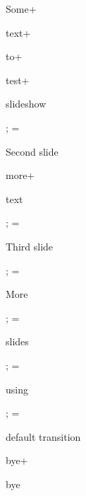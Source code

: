 Some\pg+

\transition[Dissolve:4]

text\pg+

to\pg+

test\pg+

slideshow

\pg;
\glet\bgcolor=\Green
\transition[Split:3:/Dm /V /M /I]

\sec Second slide

\transitions[Blinds:2]

more\pg+

text

\transitions[Wipe]

\pg;
\glet\bgcolor=\Brown
\transition[Dissolve]

\sec Third slide

\pg;
\glet\bgcolor=\Red
\transition[Box]

\sec More

\pg;
\glet\bgcolor=\Yellow

\sec slides

\pg;
\glet\bgcolor=\Red

\sec using

\pg;
\glet\bgcolor=\Yellow

\sec default transition

bye\pg+

bye

\bye
